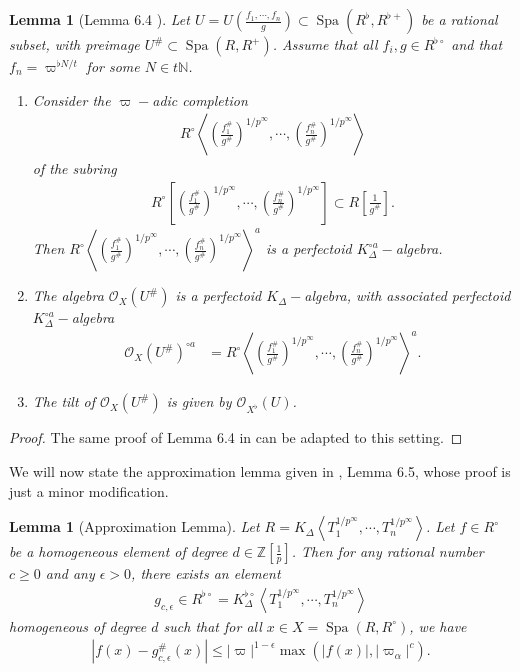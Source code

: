 \documentclass[12pts,a4paper]{amsart}
\newtheorem{lemma}[proposition]{Lemma}
\DeclareMathOperator{\spa}{Spa}
\begin{document}
\begin{lemma}[Lemma 6.4 \cite{Sch}]\label{Almost Rational Subset}
   Let $U=U\left(\frac{f_1,\cdots,f_n}{g}\right)\subset\spa(R^\flat,R^{\flat+})$ be a rational subset, with preimage $U^{\#}\subset\spa(R,R^+)$. Assume that all $f_i,g\in R^{\flat\circ}$ and that $f_n=\varpi^{\flat N/t}$ for some $N\in t\mathbb{N}$.
\begin{enumerate}
    \item[(i).] Consider the $\varpi-$adic completion
    \begin{align*}
        R^\circ\left<\left(\frac{f^\#_1}{g^\#}\right)^{1/p^\infty},\cdots,\left(\frac{f^\#_n}{g^\#}\right)^{1/p^\infty}\right>
    \end{align*}
    of the subring
    \begin{align*}
        R^\circ\left[\left(\frac{f^\#_1}{g^\#}\right)^{1/p^\infty},\cdots,\left(\frac{f^\#_n}{g^\#}\right)^{1/p^\infty}\right]\subset R\left[\frac{1}{g^\#}\right].
    \end{align*}
    Then $R^\circ\left<\left(\frac{f^\#_1}{g^\#}\right)^{1/p^\infty},\cdots,\left(\frac{f^\#_n}{g^\#}\right)^{1/p^\infty}\right>^a$ is a perfectoid $K^{\circ a}_\Delta-$algebra.
    \item[(ii).] The algebra $\mathcal{O}_X(U^\#)$ is a perfectoid $K_\Delta-$algebra, with associated perfectoid $K^{\circ a}_\Delta-$algebra
    \begin{align*}
        \mathcal{O}_X(U^\#)^{\circ a}&=R^\circ\left<\left(\frac{f^\#_1}{g^\#}\right)^{1/p^\infty},\cdots,\left(\frac{f^\#_n}{g^\#}\right)^{1/p^\infty}\right>^a.
    \end{align*}
    \item[(iii).] The tilt of $\mathcal{O}_X(U^\#)$ is given by $\mathcal{O}_{X^\flat}(U)$.
\end{enumerate}
\end{lemma}

\begin{proof}
    The same proof of Lemma 6.4 in \cite{Sch} can be adapted to this setting.
\end{proof}

We will now state the approximation lemma given in \cite{Sch}, Lemma 6.5, whose proof is just a minor modification.

\begin{lemma}[Approximation Lemma]\label{Approximation Lemma}
    Let $R=K_\Delta\left<T^{1/p^\infty}_1,\cdots,T^{1/p^\infty}_n\right>$. Let $f\in R^\circ$ be a homogeneous element of degree $d\in\mathbb{Z}\left[\frac{1}{p}\right]$. Then for any rational number $c\geq 0$ and any $\epsilon>0$, there exists an element
   \begin{align*}
       g_{c,\epsilon}\in R^{\flat\circ}=K^{\flat\circ}_\Delta\left<T^{1/p^\infty}_1,\cdots,T^{1/p^\infty}_n\right>
   \end{align*}
   homogeneous of degree $d$ such that for all $x\in X=\spa(R,R^\circ)$, we have 
   \begin{align*}
    |f(x)-g^\#_{c,\epsilon}(x)|\leq |\varpi|^{1-\epsilon}\max(|f(x)|,|\varpi_\alpha|^c).
   \end{align*}
\end{lemma}
\end{document}
